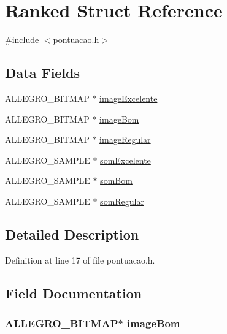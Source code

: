 \hypertarget{struct_ranked}{\section{Ranked Struct Reference}
\label{struct_ranked}
}


{\ttfamily \#include $<$pontuacao.\-h$>$}

\subsection*{Data Fields}
\begin{DoxyCompactItemize}
\item 
A\-L\-L\-E\-G\-R\-O\-\_\-\-B\-I\-T\-M\-A\-P $\ast$ \hyperlink{struct_ranked_a35a1832af793bed669bf45cb25baa25c}{image\-Excelente}
\item 
A\-L\-L\-E\-G\-R\-O\-\_\-\-B\-I\-T\-M\-A\-P $\ast$ \hyperlink{struct_ranked_abf9f3c5357b6e02c2e5114d11741c4a9}{image\-Bom}
\item 
A\-L\-L\-E\-G\-R\-O\-\_\-\-B\-I\-T\-M\-A\-P $\ast$ \hyperlink{struct_ranked_a4ccc687d0731c25cac3dd4203ad0d555}{image\-Regular}
\item 
A\-L\-L\-E\-G\-R\-O\-\_\-\-S\-A\-M\-P\-L\-E $\ast$ \hyperlink{struct_ranked_acb25ecfb3cf37f98d8726bfbfca5ff50}{som\-Excelente}
\item 
A\-L\-L\-E\-G\-R\-O\-\_\-\-S\-A\-M\-P\-L\-E $\ast$ \hyperlink{struct_ranked_aa838844e2fa34dd7aa742a35c08042f6}{som\-Bom}
\item 
A\-L\-L\-E\-G\-R\-O\-\_\-\-S\-A\-M\-P\-L\-E $\ast$ \hyperlink{struct_ranked_ac648305e0a64500dd62e4b7c34d50943}{som\-Regular}
\end{DoxyCompactItemize}


\subsection{Detailed Description}


Definition at line 17 of file pontuacao.\-h.



\subsection{Field Documentation}
\hypertarget{struct_ranked_abf9f3c5357b6e02c2e5114d11741c4a9}{
\subsubsection[{image\-Bom}]{\setlength{\rightskip}{0pt plus 5cm}A\-L\-L\-E\-G\-R\-O\-\_\-\-B\-I\-T\-M\-A\-P$\ast$ image\-Bom}}\label{struct_ranked_abf9f3c5357b6e02c2e5114d11741c4a9}


